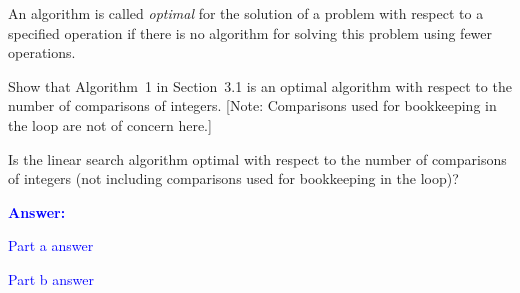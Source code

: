 \item{}
An algorithm is called \emph{optimal} for the solution of a problem with respect
to a specified operation if there is no algorithm for solving this problem using
fewer operations.
\begin{list}{\textbf{.}}{}
\item Show that Algorithm~1 in Section~3.1 is an optimal algorithm with respect
    to the number of comparisons of integers. [Note: Comparisons used for
    bookkeeping in the loop are not of concern here.]
\item Is the linear search algorithm optimal with respect to the number of
    comparisons of integers (not including comparisons used for bookkeeping in
    the loop)?
\end{list}
\vskip12pt
\ifanswers
\textcolor{blue}{
\textbf{Answer:}\\[6pt]
\begin{list}{\textbf{.}}{}
\item Part a answer
\item Part b answer
\end{list}
}
\newpage
\fi
